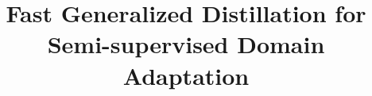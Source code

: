 \documentclass[letterpaper]{article}
\begin{document}
%
\title{Fast Generalized Distillation for Semi-supervised Domain Adaptation}
\maketitle

\end{document}
